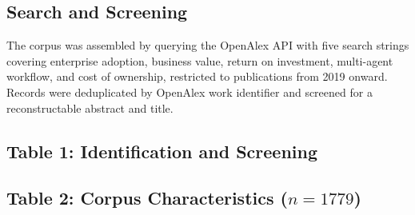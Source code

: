\documentclass[10pt,twocolumn,letterpaper]{article}
\begin{document}
\subsection{Search and Screening}


The corpus was assembled by querying the OpenAlex API with five search strings covering enterprise adoption, business value, return on investment, multi-agent workflow, and cost of ownership, restricted to publications from 2019 onward. Records were deduplicated by OpenAlex work identifier and screened for a reconstructable abstract and title.


\subsection{Table 1: Identification and Screening}
\begin{table}[htbp]
\centering
{}
\end{table}


\subsection{Table 2: Corpus Characteristics ($n = 1779$)}
\begin{table}[htbp]
\centering
{}
\end{table}
\end{document}
